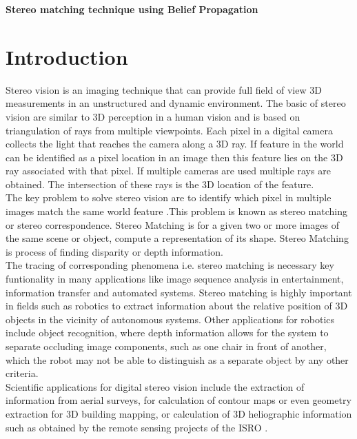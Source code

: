 \textbf{\textbf{Stereo matching technique using Belief Propagation}}

%
\textbf{}
\section{Introduction}
Stereo vision is an imaging technique that can provide full field of view 3D measurements in an unstructured and dynamic environment. The basic of stereo vision are similar to 3D perception in a human vision and is based on triangulation of rays from multiple viewpoints. Each pixel in a digital camera collects the light that reaches the camera along a 3D ray. If feature in the world can be identified as a pixel location in an image then this feature lies on the 3D ray associated with that pixel. If multiple cameras are used multiple rays are obtained. The intersection of these rays is the 3D location of the feature.\\
The key problem to solve stereo vision are to identify which pixel in multiple images match the same world feature .This problem is known as stereo matching or stereo correspondence. Stereo Matching is for a given two or more images of the same scene or object, compute a representation of its shape. Stereo Matching is process of finding disparity or depth information.\\
The tracing of corresponding phenomena i.e. stereo matching is necessary key funtionality in many applications like image sequence analysis in entertainment, information transfer and automated systems. Stereo matching is highly important in fields such as robotics to extract information about the relative position of 3D objects in the vicinity of autonomous systems. Other applications for robotics include object recognition, where depth information allows for the system to separate occluding image components, such as one chair in front of another, which the robot may not be able to distinguish as a separate object by any other criteria.\\
Scientific applications for digital stereo vision include the extraction of information from aerial surveys, for calculation of contour maps or even geometry extraction for 3D building mapping, or calculation of 3D heliographic information such as obtained by the remote sensing projects of the ISRO .

